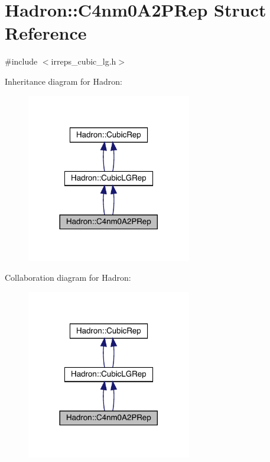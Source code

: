 \hypertarget{structHadron_1_1C4nm0A2PRep}{}\section{Hadron\+:\+:C4nm0\+A2\+P\+Rep Struct Reference}
\label{structHadron_1_1C4nm0A2PRep}


{\ttfamily \#include $<$irreps\+\_\+cubic\+\_\+lg.\+h$>$}



Inheritance diagram for Hadron\+:\nopagebreak
\begin{figure}[H]
\begin{center}
\leavevmode
\includegraphics[width=204pt]{da/da5/structHadron_1_1C4nm0A2PRep__inherit__graph}
\end{center}
\end{figure}


Collaboration diagram for Hadron\+:\nopagebreak
\begin{figure}[H]
\begin{center}
\leavevmode
\includegraphics[width=204pt]{d1/d1f/structHadron_1_1C4nm0A2PRep__coll__graph}
\end{center}
\end{figure}
